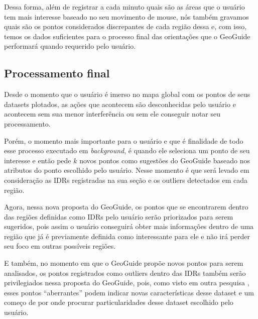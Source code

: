 Dessa forma, além de registrar a cada minuto quais são as áreas que o usuário tem mais interesse baseado no seu movimento de mouse, nós também gravamos quais são os pontos considerados discrepantes de cada região dessa e, com isso, temos os dados suficientes para o processo final das orientações que o GeoGuide performará quando requerido pelo usuário.

\subsection{Processamento final}

Desde o momento que o usuário é imerso no mapa global com os pontos de seus datasets plotados, as ações que acontecem são desconhecidas pelo usuário e acontecem sem sua menor interferência ou sem ele conseguir notar seu processamento.

Porém, o momento mais importante para o usuário e que é finalidade de todo esse processo executado em \textit{background}, é quando ele seleciona um ponto de seu interesse e então pede $k$ novos pontos como sugestões do GeoGuide baseado nos atributos do ponto escolhido pelo usuário. Nesse momento é que será levado em consideração as IDRs registradas na sua seção e os outliers detectados em cada região.

Agora, nessa nova proposta do GeoGuide, os pontos que se encontrarem dentro das regiões definidas como IDRs pelo usuário serão priorizados para serem sugeridos, pois assim o usuário conseguirá obter mais informações dentro de uma região que já é previamente definida como interessante para ele e não irá perder seu foco em outras possíveis regiões.

E também, no momento em que o GeoGuide propõe novos pontos para serem analisados, os pontos registrados como outliers dentro das IDRs também serão privilegiados nessa proposta do GeoGuide, pois, como visto em outra pesquisa \cite{DBLP:journals/debu/FreireCVZ16}, esses pontos ``aberrantes'' podem indicar novas características desse dataset e um começo de por onde procurar particularidades desse dataset escolhido pelo usuário.

